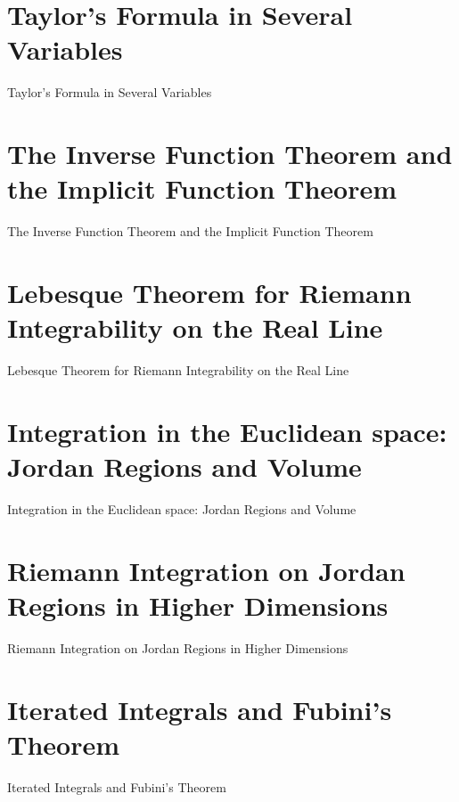 \section{Taylor's Formula in Several Variables}
\label{sec:taylor-s-formula-in-several-variables}

Taylor's Formula in Several Variables

\section{The Inverse Function Theorem and the Implicit Function Theorem}
\label{sec:the-inverse-function-theorem-and-the-implicit-function-theorem}

The Inverse Function Theorem and the Implicit Function Theorem

\section{Lebesque Theorem for Riemann Integrability on the Real Line}
\label{sec:lebesque-theorem-for-riemann-integrability-on-the-real-line}

Lebesque Theorem for Riemann Integrability on the Real Line

\section{Integration in the Euclidean space: Jordan Regions and Volume}
\label{sec:integration-in-the-euclidean-space-jordan-regions-and-volume}

Integration in the Euclidean space: Jordan Regions and Volume

\section{Riemann Integration on Jordan Regions in Higher Dimensions}
\label{sec:riemann-integration-on-jordan-regions-in-higher-dimensions}

Riemann Integration on Jordan Regions in Higher Dimensions

\section{Iterated Integrals and Fubini's Theorem}
\label{sec:iterated-integrals-and-fubini-s-theorem}

Iterated Integrals and Fubini's Theorem
